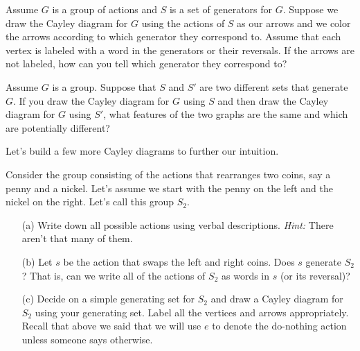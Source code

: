\begin{exercise}\label{exer:understanding_arrows}
Assume \(G\) is a group of actions and \(S\) is a set of generators for \(G\). Suppose we draw the Cayley diagram for \(G\) using the actions of \(S\) as our arrows and we color the arrows according to which generator they correspond to.  Assume that each vertex is labeled with a word in the generators or their reversals.  If the arrows are not labeled, how can you tell which generator they correspond to?
\end{exercise}

\begin{exercise}\label{exer:changing_generators_for_Cayley_diagram}
Assume \(G\) is a group.  Suppose that \(S\) and \(S'\) are two different sets that generate \(G\).  If you draw the Cayley diagram for \(G\) using \(S\) and then draw the Cayley diagram for \(G\) using \(S'\), what features of the two graphs are the same and which are potentially different?
\end{exercise}

Let's build a few more Cayley diagrams to further our intuition.

\begin{exercise}\label{exer:introducing_S2}
Consider the group consisting of the actions that rearranges two coins, say a penny and a nickel.  Let's assume we start with the penny on the left and the nickel on the right.  Let's call this group \(S_2\).

\begin{enumerate}
\item[(a)] Write down all possible actions using verbal descriptions.  \emph{Hint:} There aren't that many of them.
\item[(b)] Let \(s\) be the action that swaps the left and right coins.  Does \(s\) generate \(S_2\)?  That is, can we write all of the actions of \(S_2\) as words in \(s\) (or its reversal)?
\item[(c)] Decide on a simple generating set for \(S_2\) and draw a Cayley diagram for \(S_2\) using your generating set.  Label all the vertices and arrows appropriately.  Recall that above we said that we will use \(e\) to denote the do-nothing action unless someone says otherwise.
\end{enumerate}
\end{exercise}

